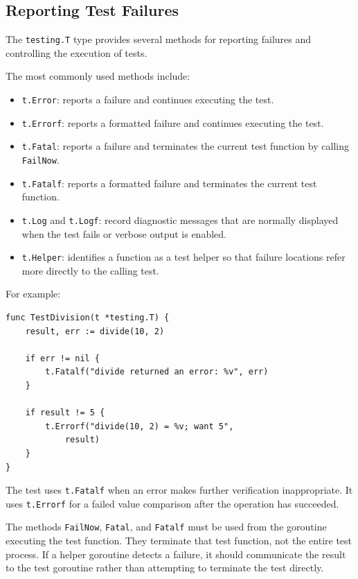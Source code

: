 \subsection{Reporting Test Failures}

The \texttt{testing.T} type provides several methods for reporting failures and controlling the execution of tests.

The most commonly used methods include:

\begin{itemize}
    \item \texttt{t.Error}: reports a failure and continues executing the test.
    \item \texttt{t.Errorf}: reports a formatted failure and continues executing the test.
    \item \texttt{t.Fatal}: reports a failure and terminates the current test function by calling \texttt{FailNow}.
    \item \texttt{t.Fatalf}: reports a formatted failure and terminates the current test function.
    \item \texttt{t.Log} and \texttt{t.Logf}: record diagnostic messages that are normally displayed when the test fails or verbose output is enabled.
    \item \texttt{t.Helper}: identifies a function as a test helper so that failure locations refer more directly to the calling test.
\end{itemize}

For example:

\begin{lstlisting}
func TestDivision(t *testing.T) {
    result, err := divide(10, 2)

    if err != nil {
        t.Fatalf("divide returned an error: %v", err)
    }

    if result != 5 {
        t.Errorf("divide(10, 2) = %v; want 5",
            result)
    }
}
\end{lstlisting}

The test uses \texttt{t.Fatalf} when an error makes further verification inappropriate. It uses \texttt{t.Errorf} for a failed value comparison after the operation has succeeded.

The methods \texttt{FailNow}, \texttt{Fatal}, and \texttt{Fatalf} must be used from the goroutine executing the test function. They terminate that test function, not the entire test process. If a helper goroutine detects a failure, it should communicate the result to the test goroutine rather than attempting to terminate the test directly.

